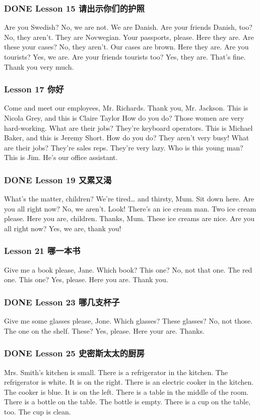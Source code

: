 \documentclass[11pt]{ctexart}
\begin{document}
\subsubsection{{\bfseries\sffamily DONE} Lesson 15 请出示你们的护照}
\label{sec:org88d94f9}
Are you Swedish?
No, we are not.
We are Danish.
Are your friends Danish, too?
No, they aren't.
They are Novwegian.
Your passports, please.
Here they are.
Are these your cases?
No, they aren't.
Our cases are brown.
Here they are.
Are you tourists?
Yes, we are.
Are your friends tourists too?
Yes, they are.
That's fine.
Thank you very much.

\subsubsection{Lesson 17 你好}
\label{sec:org50aaf9b}
Come and meet our employees, Mr. Richards.
Thank you, Mr. Jackson.
This is Nicola Grey,
and this is Claire Taylor
How do you do?
Those women are very hard-working.
What are their jobs?
They're keyboard operators.
This is Michael Baker,
and this is Jeremy Short.
How do you do?
They aren't very busy!
What are their jobs?
They're sales reps.
They're very lazy.
Who is this young man?
This is Jim.
He's our office assistant.
\subsubsection{{\bfseries\sffamily DONE} Lesson 19 又累又渴}
\label{sec:org8c52698}
What's the matter, children?
We're tired\ldots{}
and thirsty, Mum.
Sit down here.
Are you all right now?
No, we aren't.
Look!
There's an ice cream man.
Two ice cream please.
Here you are, children.
Thanks, Mum.
These ice creams are nice.
Are you all right now?
Yes, we are, thank you!
\subsubsection{Lesson 21 哪一本书}
\label{sec:orgcc974ff}
Give me a book please, Jane.
Which book?
This one?
No, not that one.
The red one.
This one?
Yes, please.
Here you are.
Thank you.
\subsubsection{{\bfseries\sffamily DONE} Lesson 23 哪几支杯子}
\label{sec:org5f2c5b1}
Give me some glasses please, Jone.
Which glasses?
These glasses?
No, not those.
The one on the shelf.
These?
Yes, please.
Here your are.
Thanks.
\subsubsection{{\bfseries\sffamily DONE} Lesson 25 史密斯太太的厨房}
\label{sec:orga28d1e6}
Mrs. Smith's kitchen is small.
There is a refrigerator in the kitchen.
The refrigerator is white.
It is on the right.
There is an electric cooker in the kitchen.
The cooker is blue.
It is on the left.
There is a table in the middle of the room.
There is a bottle on the table.
The bottle is empty.
There is a cup on the table, too.
The cup is clean.
\end{document}
